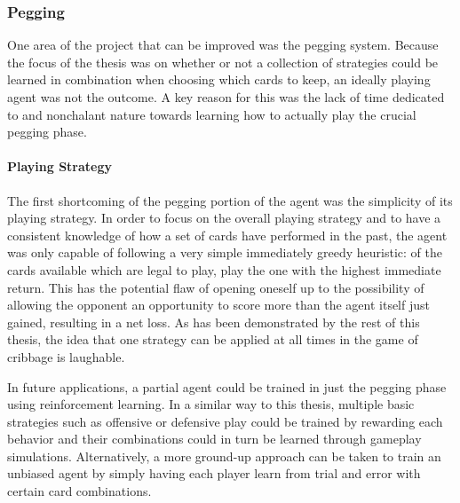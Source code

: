 
\subsubsection*{Pegging}
\label{sec:disc-future-pegging}



One area of the project that can be improved was the pegging system.
%
Because the focus of the thesis was on whether or not a collection of
strategies could be learned in combination when choosing which cards to keep,
an ideally playing agent was not the outcome.
%
A key reason for this was the lack of time dedicated to and nonchalant nature
towards learning how to actually play the crucial pegging phase.

\paragraph*{Playing Strategy}


The first shortcoming of the pegging portion of the agent was the simplicity
of its playing strategy.
%
In order to focus on the overall playing strategy and to have a consistent
knowledge of how a set of cards have performed in the past,
the agent was only capable of following a very simple immediately greedy 
heuristic:
of the cards available which are legal to play,
play the one with the highest immediate return.
%
This has the potential flaw of
opening oneself up to the possibility of allowing the opponent an opportunity
to score more than the agent itself just gained,
resulting in a net loss.
%
As has been demonstrated by the rest of this thesis,
the idea that one strategy can be applied at all times in the game of cribbage
is laughable.

In future applications,
a partial agent could be trained in just the pegging phase
using reinforcement learning.
%
In a similar way to this thesis,
multiple basic strategies such as offensive or defensive play
could be trained by rewarding each behavior and their combinations
could in turn be learned through gameplay simulations.
%
Alternatively,
a more ground-up approach can be taken to train an unbiased agent by simply
having each player learn from trial and error with certain card combinations.
%

